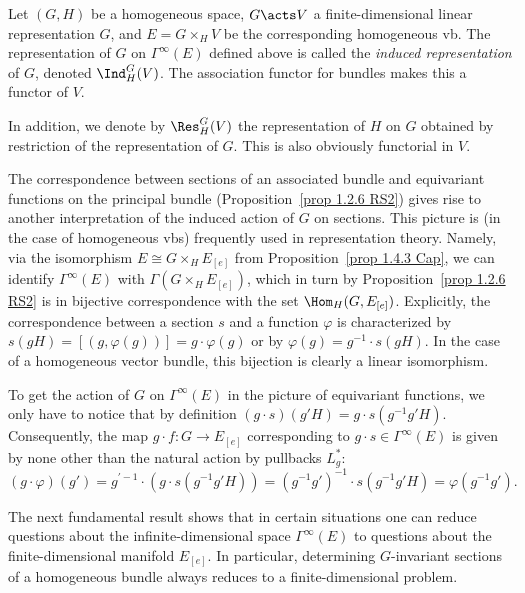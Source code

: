 \begin{defn}
    Let $(G,H)$ be a homogeneous space, $G\acts V$ a finite-dimensional linear representation $G$, and $E=G\times_H V$ be the corresponding homogeneous \gls{vb}. The representation of $G$ on $\Gamma^\infty(E)$ defined above is called the \emph{induced representation} of $G$, denoted $\Ind^G_H(V)$. The association functor for bundles makes this a functor of $V$.

    In addition, we denote by $\Res^G_H(V)$ the representation of $H$ on $G$ obtained by restriction of the representation of $G$. This is also obviously functorial in $V$.
\end{defn}

The correspondence between sections of an associated bundle and equivariant functions on the principal bundle (Proposition~\ref{prop 1.2.6 RS2}) gives rise to another interpretation of the induced action of $G$ on sections. This picture is (in the case of homogeneous \glspl{vb}) frequently used in representation theory. Namely, via the isomorphism $E\cong G\times_H E_{[e]}$ from Proposition~\ref{prop 1.4.3 Cap}, we can identify $\Gamma^\infty(E)$ with $\Gamma\left(G\times_H E_{[e]}\right)$, which in turn by Proposition~\ref{prop 1.2.6 RS2} is in bijective correspondence with the set $\Hom_H(G,E_{[e]})$. Explicitly, the correspondence between a section $s$ and a function $\varphi$ is characterized by $s(gH)=[(g,\varphi(g))]=g\cdot \varphi(g)$ or by $\varphi(g)=g^{-1}\cdot s(gH)$. In the case of a homogeneous vector bundle, this bijection is clearly a linear isomorphism.

To get the action of $G$ on $\Gamma^\infty(E)$ in the picture of equivariant functions, we only have to notice that by definition $(g\cdot  s)(g'H)=g\cdot  s(g^{-1}g'H)$. Consequently, the map $g\cdot f:G\to E_{[e]}$ corresponding to $g\cdot s\in \Gamma^\infty(E)$ is given by none other than the natural action by pullbacks $L_g^\ast$:
\[(g\cdot \varphi)(g')=g^{\prime-1}\cdot(g\cdot s(g^{-1}g'H))=(g^{-1}g')^{-1}\cdot s(g^{-1}g'H)=\varphi(g^{-1}g').\]

The next fundamental result shows that in certain situations one can reduce questions about the infinite-dimensional space $\Gamma^\infty(E)$ to questions about the finite-dimensional manifold $E_{[e]}$. In particular, determining $G$-invariant sections of a homogeneous bundle always reduces to a finite-dimensional problem.

